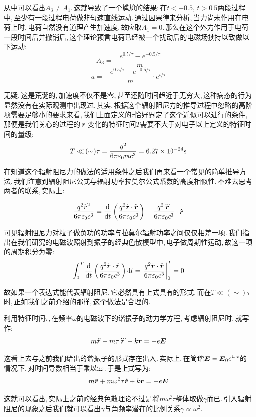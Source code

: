 从中可以看出$A_3\neq A_1$.\,这就导致了一个尴尬的结果:\,在$t<-0.5,\,t>0.5$两段过程中,\,至少有一段过程电荷做非匀速直线运动.\,通过因果律来分析,\,当力尚未作用在电荷上时,\,电荷自然没有道理产生加速度.\,故应取$A_1=0$.\,那么在这个外力作用于电荷一段时间后并撤销后,\,这个理论预言电荷已经被一个扰动后的电磁场挟持以致做以下运动:
\[A_3=-\frac{e^{0.5/\tau}-e^{-0.5/\tau}}{m}\]
\[a=-\frac{e^{0.5/\tau}-e^{-0.5/\tau}}{m}\cdot e^{t/\tau}\]

无疑,\,这是荒诞的,\,加速度不仅不是零,\,甚至还随时间趋近于无穷大,\,这种病态的行为显然没有在实际观测中出现过.\,其实,\,根据这个辐射阻尼力的推导过程中忽略的高阶项需要足够小的要求来看,\,我们上面定义的$\tau$恰好界定了这个近似可以进行的条件,\,那便是我们关心的过程的$\dddot{\boldsymbol{r}}$变化的特征时间$T$需要不大于对电子以上定义的特征时间的量级:
\[T\ll(\sim) \tau=\frac{q^2}{6\pi\varepsilon_0 mc^3}=6.27\times 10^{-24}{\rm s}\]

在知道这个辐射阻尼力的做法的适用条件之后我们再来看一个常见的简单推导方法.\,我们注意到辐射阻尼公式与辐射功率拉莫尔公式系数的高度相似性.\,不难去思考两者的联系,\,实际上:

\[\frac{q^2\ddot{\boldsymbol{r}}^2}{6\pi\varepsilon_0c^3}=\frac{\textrm{d} }{\textrm{d} t}\left(\frac{q^2\dot{\boldsymbol{r}}\cdot \ddot{\boldsymbol{r}}}{6\pi\varepsilon_0c^3}\right)-\frac{q^2\dddot{\boldsymbol{r}}}{6\pi\varepsilon_0c^3}\cdot \dot{\boldsymbol{r}}\]

可见辐射阻尼力对粒子做负功的功率与拉莫尔辐射功率之间仅仅相差一项.\,我们指出在我们研究的电磁波照射到振子的经典色散模型中,\,电子做周期性运动,\,故这一项的周期积分为零:
\[\int_0^T \frac{\textrm{d} }{\textrm{d} t}\left(\frac{q^2\dot{\boldsymbol{r}}\cdot \ddot{\boldsymbol{r}}}{6\pi\varepsilon_0c^3}\right)\textrm{d} t=\left.\frac{q^2\dot{\boldsymbol{r}}\cdot \ddot{\boldsymbol{r}}}{6\pi\varepsilon_0c^3}\right|_0^T=0\]

故如果一个表达式能代表辐射阻尼,\,它必然具有上式具有的形式.\,而在$T\ll(\sim)\tau$时,\,正如我们之前介绍的那样,\,这个做法是合理的.

利用特征时间$\tau$,\,在频率$\omega$的电磁波下的谐振子的动力学方程,\,考虑辐射阻尼时,\,就写作:
\[m\boldsymbol{\ddot{r}}-m\tau \boldsymbol{\dddot{r}}+k\boldsymbol{r}=-e\boldsymbol{E}\]

这看上去与之前我们给出的谐振子的形式存在出入.\,实际上,\,在简谐$\boldsymbol{E}=\boldsymbol{E}_0 e^{{\rm i} \omega t}$的情况下,\,对时间导数相当于乘以${\rm i}\omega$.\,于是上式写为:
\[m\boldsymbol{\ddot{r}}+m\omega^2\tau \boldsymbol{\dot{r}}+k\boldsymbol{r}=-e\boldsymbol{E}\]

这就可以看出,\,实际上之前的经典色散理论不过是将$m\omega^2\tau$整体取做$\gamma $而已.\,引入辐射阻尼的现象之后我们就可以看出$\gamma$与角频率潜在的比例关系$\gamma \propto \omega^2$.

